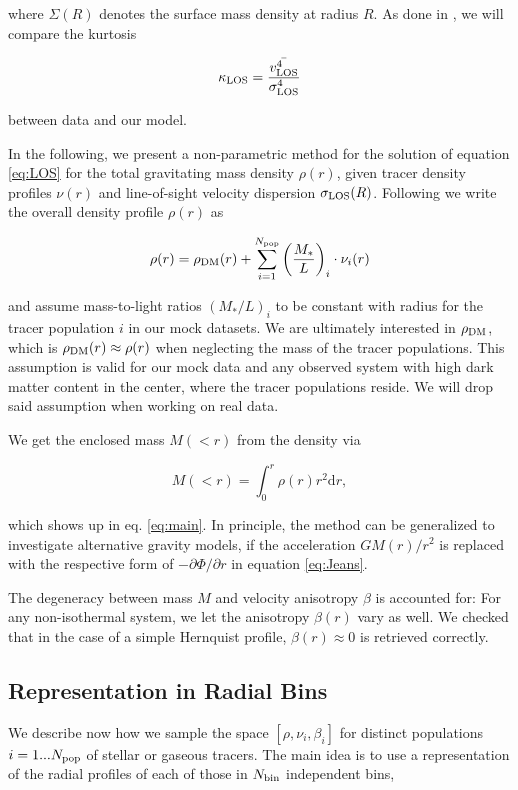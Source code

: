 where $\Sigma(R)$ denotes the surface mass density at radius $R$. As
done in \cite{Lokas+2005}, we will compare the kurtosis

\begin{equation*}
    \kappa_{\rm LOS}=\frac{\bar{v_{\rm LOS}^4}}{\sigma_{\rm LOS}^4}
\end{equation*}

between data and our model.

In the following, we present a non-parametric method for the solution
of equation \ref{eq:LOS} for the total gravitating mass density
$\rho(r)$, given tracer density profiles $\nu(r)$ and line-of-sight
velocity dispersion $\sigma_{\text{LOS}}(R)$. Following \cite{Jardel+2012} we
write the overall density profile $\rho(r)$ as

\begin{equation}
    \rho(r) = \rho_{\rm{DM}}(r)+\sum_{i=1}^{N_{\rm pop}}\left(\frac{M_*}{L}\right)_{i}\cdot \nu_i(r)
\end{equation}

and assume mass-to-light ratios $(M_*/L)_i$ to be constant with radius
for the tracer population $i$ in our mock datasets. We are ultimately
interested in $\rho_{\rm{DM}}$, which is
$\rho_{\rm{DM}}(r)\approx\rho(r)$ when neglecting the mass of the
tracer populations. This assumption is valid for our mock data and any
observed system with high dark matter content in the center, where the
tracer populations reside. We will drop said assumption when working
on real data.

We get the enclosed mass $M(<r)$ from the density via

\begin{equation}
    M(<r) = \int_0^r \rho(r) r^2 \text{d}r,
\end{equation}

which shows up in eq. \ref{eq:main}. In principle, the method can be
generalized to investigate alternative gravity models, if the
acceleration $GM(r)/r^2$ is replaced with the respective form of
$-\partial\Phi/\partial r$ in equation \ref{eq:Jeans}.

The degeneracy between mass $M$ and velocity anisotropy $\beta$ is
accounted for: For any non-isothermal system, we let the anisotropy
$\beta(r)$ vary as well. We checked that in the case of a simple
Hernquist profile, $\beta(r)\approx0$ is retrieved correctly.

\subsection{Representation in Radial Bins}
We describe now how we sample the space $[\rho, \nu_i, \beta_i]$
for distinct populations $i=1...N_{\rm pop}$ of stellar or gaseous
tracers. The main idea is to use a representation of the radial
profiles of each of those in $N_{\rm bin}$ independent bins,

